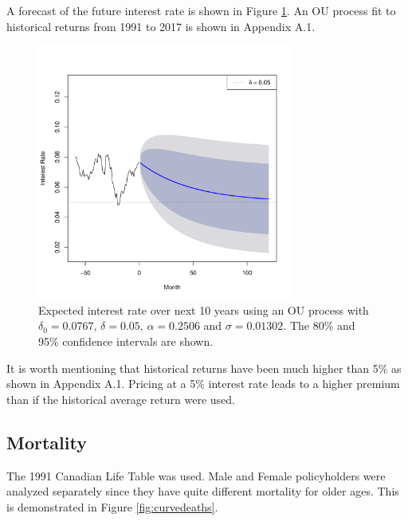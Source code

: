 \documentclass[12pt]{article}
\begin{document}
A forecast of the future interest rate is shown in Figure \ref{fig:ouforecast}. An OU process fit to historical returns from 1991 to 2017 is shown in Appendix A.1.

\begin{figure}[ht]
\begin{center}
\vspace{-12.5mm}
\includegraphics[width=0.75\textwidth]{images/arforecast}
\end{center}
\caption{Expected interest rate over next 10 years using an OU process with $\delta_{0} = 0.0767$, $\delta = 0.05$, $\alpha = 0.2506$ and $\sigma = 0.01302$. The 80\% and 95\% confidence intervals are shown.}
\label{fig:ouforecast}
\end{figure}

It is worth mentioning that historical returns have been much higher than 5\% as shown in Appendix A.1. Pricing at a 5\% interest rate leads to a higher premium than if the historical average return were used.

\subsection{Mortality}

The 1991 Canadian Life Table was used. Male and Female policyholders were analyzed separately since they have quite different mortality for older ages. This is demonstrated in Figure \ref{fig:curvedeaths}.
\end{document}
